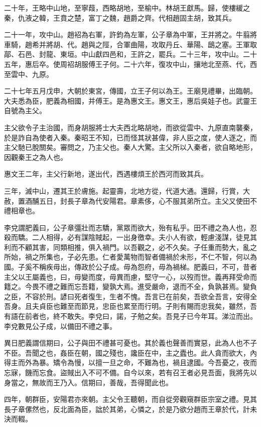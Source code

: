 二十年，王略中山地，至寧葭，西略胡地，至榆中。林胡王獻馬。歸，使樓緩之秦，仇液之韓，王賁之楚，富丁之魏，趙爵之齊。代相趙固主胡，致其兵。

二十一年，攻中山。趙袑為右軍，許鈞為左軍，公子章為中軍，王并將之。牛翦將車騎，趙希并將胡、代。趙與之陘，合軍曲陽，攻取丹丘、華陽、鴟之塞。王軍取鄗、石邑、封龍、東垣。中山獻四邑和，王許之，罷兵。二十三年，攻中山。二十五年，惠后卒。使周袑胡服傅王子何。二十六年，復攻中山，攘地北至燕、代，西至雲中、九原。

二十七年五月戊申，大朝於東宮，傳國，立王子何以為王。王廟見禮畢，出臨朝。大夫悉為臣，肥義為相國，并傅王。是為惠文王。惠文王，惠后吳娃子也。武靈王自號為主父。

主父欲令子主治國，而身胡服將士大夫西北略胡地，而欲從雲中、九原直南襲秦，於是詐自為使者入秦。秦昭王不知，已而怪其狀甚偉，非人臣之度，使人逐之，而主父馳已脫關矣。審問之，乃主父也。秦人大驚。主父所以入秦者，欲自略地形，因觀秦王之為人也。

惠文王二年，主父行新地，遂出代，西遇樓煩王於西河而致其兵。

三年，滅中山，遷其王於膚施。起靈壽，北地方從，代道大通。還歸，行賞，大赦，置酒酺五日，封長子章為代安陽君。章素侈，心不服其弟所立。主父又使田不禮相章也。

李兌謂肥義曰，公子章彊壯而志驕，黨眾而欲大，殆有私乎。田不禮之為人也，忍殺而驕。二人相得，必有謀陰賊起，一出身徼幸。夫小人有欲，輕慮淺謀，徒見其利而不顧其害，同類相推，俱入禍門。以吾觀之，必不久矣。子任重而勢大，亂之所始，禍之所集也，子必先患。仁者愛萬物而智者備禍於未形，不仁不智，何以為國。子奚不稱疾毋出，傳政於公子成。毋為怨府，毋為禍梯。肥義曰，不可，昔者主父以王屬義也，曰，毋變而度，毋異而慮，堅守一心，以歿而世。義再拜受命而籍之。今畏不禮之難而忘吾籍，變孰大焉。進受嚴命，退而不全，負孰甚焉。變負之臣，不容於刑。諺曰死者復生，生者不愧。吾言已在前矣，吾欲全吾言，安得全吾身。且夫貞臣也難至而節見，忠臣也累至而行明。子則有賜而忠我矣，雖然，吾有語在前者也，終不敢失。李兌曰，諾，子勉之矣。吾見子已今年耳。涕泣而出。李兌數見公子成，以備田不禮之事。

異日肥義謂信期曰，公子與田不禮甚可憂也。其於義也聲善而實惡，此為人也不子不臣。吾聞之也，姦臣在朝，國之殘也，讒臣在中，主之蠹也。此人貪而欲大，內得主而外為暴。矯令為慢，以擅一旦之命，不難為也，禍且逮國。今吾憂之，夜而忘寐，饑而忘食。盜賊出入不可不備。自今以來，若有召王者必見吾面，我將先以身當之，無故而王乃入。信期曰，善哉，吾得聞此也。

四年，朝群臣，安陽君亦來朝。主父令王聽朝，而自從旁觀窺群臣宗室之禮。見其長子章傫然也，反北面為臣，詘於其弟，心憐之，於是乃欲分趙而王章於代，計未決而輟。

